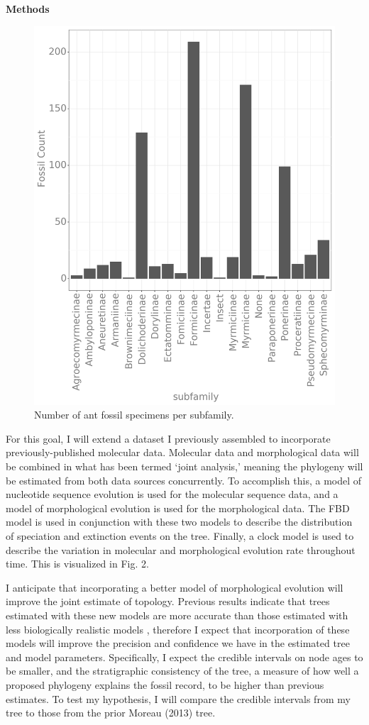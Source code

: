 \documentclass[12pt]{article}
\begin{document}
\textbf{Methods} \par
  \begin{figure}
    \includegraphics[width=.5\textwidth]{Fig3.png}
     \caption{Number of ant fossil specimens per subfamily.}
\end{figure}
For this goal, I will extend a dataset I previously assembled to incorporate previously-published molecular data.
Molecular data and morphological data will be combined in what has been termed `joint analysis,' meaning the phylogeny will be estimated from both data sources concurrently.
To accomplish this, a model of nucleotide sequence evolution is used for the molecular sequence data, and a model of morphological evolution is used for the morphological data.
The FBD model is used in conjunction with these two models to describe the distribution of speciation and extinction events on the tree.
Finally, a clock model is used to describe the variation in molecular and morphological evolution rate throughout time.
This is visualized in Fig. 2. \par
I anticipate that incorporating a better model of morphological evolution will improve the joint estimate of topology. 
Previous results indicate that trees estimated with these new models are more accurate than those estimated with less biologically realistic models \cite{Wright2016}, therefore I expect that incorporation of these models will improve the precision and confidence we have in the estimated tree and model parameters. 
Specifically, I expect the credible intervals on node ages to be smaller, and the stratigraphic consistency \cite{Siddall1996} of the tree, a measure of how well a proposed phylogeny explains the fossil record, to be higher than previous estimates. 
To test my hypothesis, I will compare the credible intervals from my tree to those from the prior Moreau (2013) tree.
\end{document}
